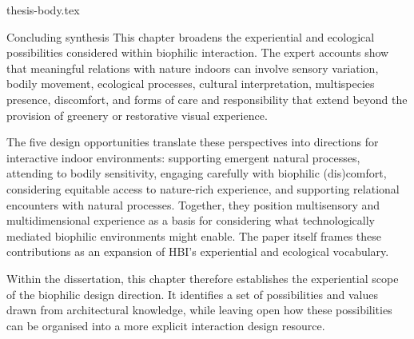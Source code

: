\clearpage

{thesis-body.tex}
\clearpage

\begin{chapterclosing}{Concluding synthesis}
This chapter broadens the experiential and ecological possibilities considered within biophilic interaction. The expert accounts show that meaningful relations with nature indoors can involve sensory variation, bodily movement, ecological processes, cultural interpretation, multispecies presence, discomfort, and forms of care and responsibility that extend beyond the provision of greenery or restorative visual experience.

The five design opportunities translate these perspectives into directions for interactive indoor environments: supporting emergent natural processes, attending to bodily sensitivity, engaging carefully with biophilic (dis)comfort, considering equitable access to nature-rich experience, and supporting relational encounters with natural processes. Together, they position multisensory and multidimensional experience as a basis for considering what technologically mediated biophilic environments might enable. The paper itself frames these contributions as an expansion of HBI's experiential and ecological vocabulary. 

Within the dissertation, this chapter therefore establishes the experiential scope of the biophilic design direction. It identifies a set of possibilities and values drawn from architectural knowledge, while leaving open how these possibilities can be organised into a more explicit interaction design resource.

\end{chapterclosing}